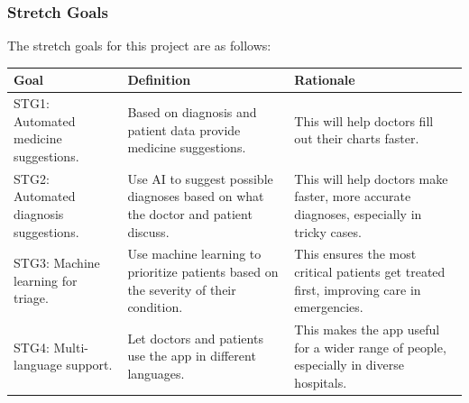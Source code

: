 \documentclass[12pt]{article}
\newcounter{goalnum} %
\begin{document}
\subsubsection{Stretch Goals}
The stretch goals for this project are as follows:
\begin{table}[H]
    \centering
    \begin{tabular}{p{4cm} p{4cm} p{4cm}}
        \toprule
        \textbf{Goal} & \textbf{Definition} & \textbf{Rationale} \\
        \midrule
        STG1: Automated medicine suggestions. & Based on diagnosis and patient data provide medicine suggestions. & This will help doctors fill out their charts faster. \\ %
        \midrule
        STG2: Automated diagnosis suggestions.  & Use AI to suggest possible diagnoses based on what the doctor and patient discuss.  & This will help doctors make faster, more accurate diagnoses, especially in tricky cases.\\ 
        \midrule
        STG3: Machine learning for triage.  & Use machine learning to prioritize patients based on the severity of their condition. & This ensures the most critical patients get treated first, improving care in emergencies. \\
        \midrule 
        STG4: Multi-language support. & Let doctors and patients use the app in different languages.  & This makes the app useful for a wider range of people, especially in diverse hospitals. \\
        \bottomrule
    \end{tabular}
\end{table}


\end{document}

